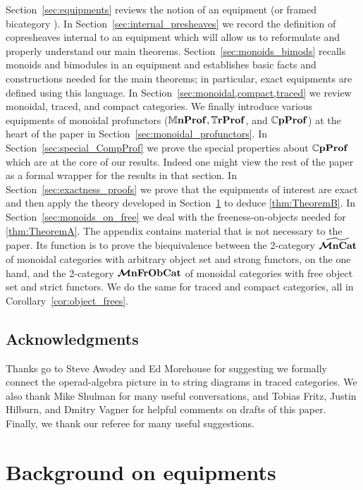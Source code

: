 \documentclass[11pt,oneside,article]{memoir}
\begin{document}
Section~\ref{sec:equipments} reviews the notion of an equipment (or framed bicategory
\cite{Shulman}). In Section~\ref{sec:internal_presheaves} we record the definition of copresheaves
internal to an equipment which will allow us to reformulate and properly understand our main
theorems. Section~\ref{sec:monoids_bimods} recalls monoids and bimodules in an equipment and
establishes basic facts and constructions needed for the main theorems; in particular, exact
equipments \cite{Schultz2015} are defined using this language. In
Section~\ref{sec:monoidal,compact,traced} we review monoidal, traced, and compact categories. We
finally introduce various equipments of monoidal profunctors ($\mathbb{M}\mathbf{nProf}, \mathbb{T}\mathbf{rProf}$, and
$\mathbb{C}\mathbf{pProf}$) at the heart of the paper in Section~\ref{sec:monoidal_profunctors}.  In
Section~\ref{sec:special_CompProf} we prove the special properties about $\mathbb{C}\mathbf{pProf}$ which are at
the core of our results. Indeed one might view the rest of the paper as a formal wrapper for the
results in that section. In Section~\ref{sec:exactness_proofs} we prove that the equipments of
interest are exact and then apply the theory developed in Section~\ref{chap:background_equipments}
to deduce \ref{thm:TheoremB}. In Section~\ref{sec:monoids_on_free} we deal with the
freeness-on-objects needed for \ref{thm:TheoremA}. The appendix contains material that is not
necessary to the paper. Its function is to prove the biequivalence between the 2-category
$\widetilde{\bm{\mathcal{M}}\mathbf{nCat}}$ of monoidal categories with arbitrary object set and strong functors, on the one
hand, and the 2-category $\bm{\mathcal{M}}\mathbf{nFrObCat}$ of monoidal categories with free object set and strict
functors. We do the same for traced and compact categories, all in Corollary~\ref{cor:object_frees}.

\section*{Acknowledgments}

Thanks go to Steve Awodey and Ed Morehouse for suggesting we formally connect the operad-algebra
picture in \cite{RupelSpivak} to string diagrams in traced categories. We also thank Mike Shulman
for many useful conversations, and Tobias Fritz, Justin Hilburn, and Dmitry Vagner for helpful
comments on drafts of this paper. Finally, we thank our referee for many useful suggestions.

\chapter{Background on equipments}
      \label{chap:background_equipments}
\end{document}
